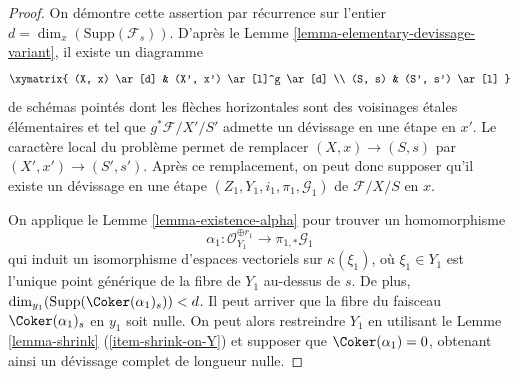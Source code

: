 \begin{proof}
On démontre cette assertion par récurrence sur l'entier
$d = \dim_x(\text{Supp}(\mathcal{F}_s))$.
D'après le
Lemme \ref{lemma-elementary-devissage-variant},
il existe un diagramme
$$
\xymatrix{
(X, x) \ar[d] & (X', x') \ar[l]^g \ar[d] \\
(S, s) & (S', s') \ar[l]
}
$$
de schémas pointés dont les flèches
horizontales sont des voisinages \'etales élémentaires
et tel que $g^*\mathcal{F}/X'/S'$ admette un d\'evissage en une étape en $x'$.
Le caractère local du problème permet de remplacer
$(X, x) \to (S, s)$ par $(X', x') \to (S', s')$. Après ce remplacement,
on peut donc supposer qu'il existe un d\'evissage en une étape
$(Z_1, Y_1, i_1, \pi_1, \mathcal{G}_1)$ de $\mathcal{F}/X/S$ en $x$.

\medskip\noindent
On applique
le Lemme \ref{lemma-existence-alpha}
pour trouver un homomorphisme
$$
\alpha_1 :
\mathcal{O}_{Y_1}^{\oplus r_1}
\longrightarrow
\pi_{1, *}\mathcal{G}_1
$$
qui induit un isomorphisme d'espaces vectoriels sur $\kappa(\xi_1)$,
où $\xi_1 \in Y_1$ est l'unique point générique de la fibre de
$Y_1$ au-dessus de $s$. De plus,
$\dim_{y_1}(\text{Supp}(\Coker(\alpha_1)_s)) < d$.
Il peut arriver que la fibre du faisceau $\Coker(\alpha_1)_s$
en $y_1$ soit nulle. On peut alors restreindre $Y_1$ en utilisant
le Lemme \ref{lemma-shrink} (\ref{item-shrink-on-Y})
et supposer que $\Coker(\alpha_1) = 0$, obtenant ainsi un
d\'evissage complet de longueur nulle.


\end{proof}
